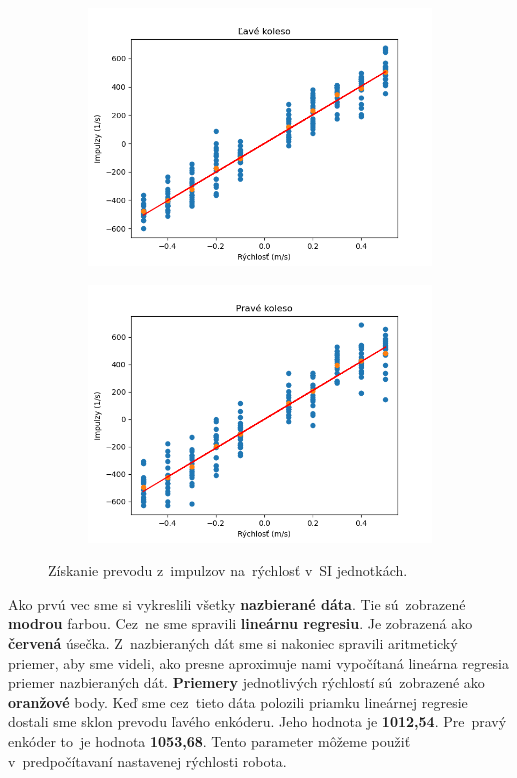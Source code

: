 \begin{figure}[!htbp]
	\begin{subfigure}{0.5\textwidth}
		\includegraphics[width=\textwidth]{img/lw_nf.png}
	\end{subfigure}
	\hfill
	\begin{subfigure}{0.5\textwidth}
		\includegraphics[width=\textwidth]{img/rw_nf.png}
	\end{subfigure}
	\caption{Získanie prevodu z~impulzov na~rýchlosť v~SI jednotkách.}
	\label{fig:rw_lw_nf}
\end{figure}

Ako prvú vec sme si vykreslili všetky \textbf{nazbierané dáta}. Tie sú~zobrazené \textbf{modrou} farbou. Cez~ne
sme spravili \textbf{lineárnu regresiu}. Je zobrazená ako \textbf{červená} úsečka. Z~nazbieraných dát sme si
nakoniec spravili aritmetický priemer, aby sme videli, ako presne aproximuje nami vypočítaná lineárna regresia priemer
nazbieraných dát. \textbf{Priemery} jednotlivých rýchlostí sú~zobrazené ako \textbf{oranžové} body.
Keď sme cez~tieto dáta polozili priamku lineárnej regresie dostali sme sklon prevodu ľavého enkóderu. Jeho
hodnota je \textbf{1012,54}. Pre~pravý enkóder to~je hodnota \textbf{1053,68}. Tento parameter
môžeme použiť v~predpočítavaní nastavenej rýchlosti robota.

